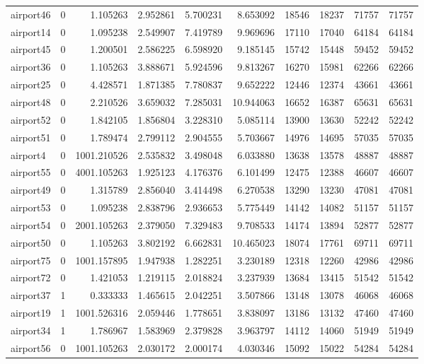 \begin{longtable}{|l|r|r|r|r|r|r|r|r|r|}
airport46 & 0 & 1.105263 & 2.952861 & 5.700231 & 8.653092 & 18546 & 18237 & 71757 & 71757 \\
airport14 & 0 & 1.095238 & 2.549907 & 7.419789 & 9.969696 & 17110 & 17040 & 64184 & 64184 \\
airport45 & 0 & 1.200501 & 2.586225 & 6.598920 & 9.185145 & 15742 & 15448 & 59452 & 59452 \\
airport36 & 0 & 1.105263 & 3.888671 & 5.924596 & 9.813267 & 16270 & 15981 & 62266 & 62266 \\
airport25 & 0 & 4.428571 & 1.871385 & 7.780837 & 9.652222 & 12446 & 12374 & 43661 & 43661 \\
airport48 & 0 & 2.210526 & 3.659032 & 7.285031 & 10.944063 & 16652 & 16387 & 65631 & 65631 \\
airport52 & 0 & 1.842105 & 1.856804 & 3.228310 & 5.085114 & 13900 & 13630 & 52242 & 52242 \\
airport51 & 0 & 1.789474 & 2.799112 & 2.904555 & 5.703667 & 14976 & 14695 & 57035 & 57035 \\
airport4 & 0 & 1001.210526 & 2.535832 & 3.498048 & 6.033880 & 13638 & 13578 & 48887 & 48887 \\
airport55 & 0 & 4001.105263 & 1.925123 & 4.176376 & 6.101499 & 12475 & 12388 & 46607 & 46607 \\
airport49 & 0 & 1.315789 & 2.856040 & 3.414498 & 6.270538 & 13290 & 13230 & 47081 & 47081 \\
airport53 & 0 & 1.095238 & 2.838796 & 2.936653 & 5.775449 & 14142 & 14082 & 51157 & 51157 \\
airport54 & 0 & 2001.105263 & 2.379050 & 7.329483 & 9.708533 & 14174 & 13894 & 52877 & 52877 \\
airport50 & 0 & 1.105263 & 3.802192 & 6.662831 & 10.465023 & 18074 & 17761 & 69711 & 69711 \\
airport75 & 0 & 1001.157895 & 1.947938 & 1.282251 & 3.230189 & 12318 & 12260 & 42986 & 42986 \\
airport72 & 0 & 1.421053 & 1.219115 & 2.018824 & 3.237939 & 13684 & 13415 & 51542 & 51542 \\
airport37 & 1 & 0.333333 & 1.465615 & 2.042251 & 3.507866 & 13148 & 13078 & 46068 & 46068 \\
airport19 & 1 & 1001.526316 & 2.059446 & 1.778651 & 3.838097 & 13186 & 13132 & 47460 & 47460 \\
airport34 & 1 & 1.786967 & 1.583969 & 2.379828 & 3.963797 & 14112 & 14060 & 51949 & 51949 \\
airport56 & 0 & 1001.105263 & 2.030172 & 2.000174 & 4.030346 & 15092 & 15022 & 54284 & 54284 \\

\end{longtable}

